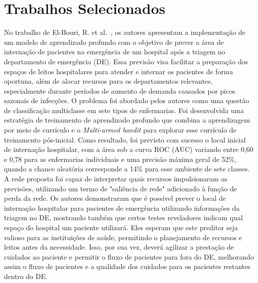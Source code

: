 \section{\label{sec:trabalhos_selecao}Trabalhos Selecionados}
No trabalho de El-Bouri, R. et al.~\cite{9103941}, os autores apresentam a implementação de um modelo de aprendizado profundo com o objetivo de prever a área de internação de pacientes na emergência de um hospital após a triagem no departamento de emergência (DE). Essa previsão visa facilitar a preparação dos espaços de leitos hospitalares para atender e internar os pacientes de forma oportuna, além de alocar recursos para os departamentos relevantes, especialmente durante períodos de aumento de demanda causados por picos sazonais de infecções. O problema foi abordado pelos autores como uma questão de classificação multiclasse em sete tipos de enfermarias. Foi desenvolvida uma estratégia de treinamento de aprendizado profundo que combina a aprendizagem por meio de currículo e o \textit{Multi-armed bandit} para explorar esse currículo de treinamento pós-inicial. Como resultado, foi previsto com sucesso o local inicial de internação hospitalar, com a área sob a curva ROC (AUC) variando entre 0,60 e 0,78 para as enfermarias individuais e uma precisão máxima geral de 52\%, quando a chance aleatória corresponde a 14\% para esse ambiente de sete classes. A rede proposta foi capaz de interpretar quais recursos impulsionaram as previsões, utilizando um termo de "saliência de rede" adicionado à função de perda da rede. Os autores demonstraram que é possível prever o local de internação hospitalar para pacientes de emergência utilizando informações da triagem no DE, mostrando também que certos testes reveladores indicam qual espaço do hospital um paciente utilizará. Eles esperam que este preditor seja valioso para as instituições de saúde, permitindo o planejamento de recursos e leitos antes da necessidade. Isso, por sua vez, deverá agilizar a prestação de cuidados ao paciente e permitir o fluxo de pacientes para fora do DE, melhorando assim o fluxo de pacientes e a qualidade dos cuidados para os pacientes restantes dentro do DE.

